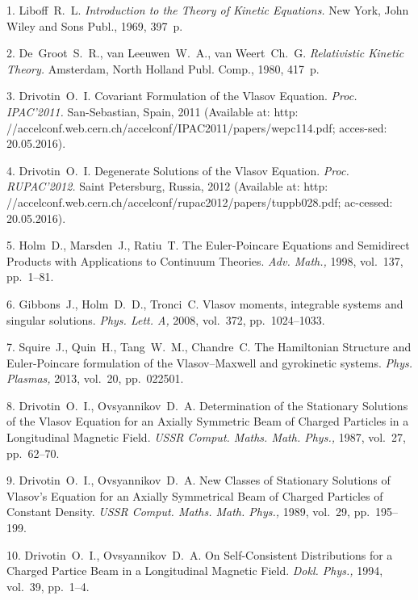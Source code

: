 

{\footnotesize

\vskip 3mm


\vskip 2mm


1. Liboff~R.~L. {\it Introduction to the Theory of Kinetic
Equations.} New York, John Wiley and Sons Publ., 1969, 397~p.


2. De~Groot~S.~R., van Leeuwen~W.~A., van Weert~Ch.~G. {\it
Relativistic Kinetic  Theory.} Amsterdam, North Holland Publ.
Comp., 1980, 417~p.

3. Drivotin~O.~I. Covariant Formulation of the Vlasov Equation.
{\it Proc. IPAC'2011.} San-Sebastian, Spain, 2011 (Available at:
http:
//accelconf.web.cern.ch/accelconf/IPAC2011/papers/wepc114.pdf;
acces-\linebreak sed: 20.05.2016).

4. Drivotin~O.~I. Degenerate Solutions of the Vlasov Equation.
{\it Proc. RUPAC'2012.} Saint Petersburg, Russia, 2012 (Available
at: http:
//accelconf.web.cern.ch/accelconf/rupac2012/papers/tuppb028.pdf;
ac-\linebreak cessed: 20.05.2016).

5. Holm~D., Marsden~J., Ratiu~T. The   Euler-Poincare Equations
and Semidirect Products with Applications to Continuum Theories.
{\it Adv. Math.,} 1998, vol.~137, pp.~1--81.

6. Gibbons~J., Holm~D.~D., Tronci~C. Vlasov moments, integrable
systems and singular solutions. {\it Phys. Lett. A,} 2008,
vol.~372, pp.~1024--1033.

7. Squire~J., Quin~H., Tang~W.~M., Chandre~C. The Hamiltonian
Structure and Euler-Poincare formulation of the Vlasov--Maxwell
and gyrokinetic systems. {\it Phys. Plasmas,} 2013, vol.~20,
pp.~022501.

8. Drivotin~O.~I., Ovsyannikov~D.~A. Determination of the
Stationary Solutions of the Vlasov Equation for an Axially
Symmetric Beam of Charged Particles in a Longitudinal Magnetic
Field. {\it USSR Comput. Maths. Math. Phys.,} 1987, {vol.~27},
pp.~62--70.

9. Drivotin~O.~I., Ovsyannikov~D.~A. New Classes of Stationary
Solutions of Vlasov's Equation for an Axially Symmetrical Beam of
Charged Particles of Constant Density. {\it USSR Comput. Maths.
Math. Phys.,} 1989, {vol.~29}, pp.~195--199.

10. Drivotin~O.~I., Ovsyannikov~D.~A. On Self-Consistent
Distributions for a Charged Partice Beam in a Longitudinal
Magnetic Field. {\it Dokl. Phys.,} 1994, vol.~39, pp.~1--4.

}
